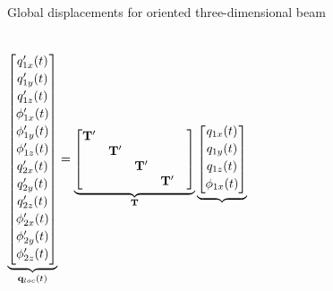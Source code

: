 \documentclass[aspectratio=169]{beamer}
\begin{document}
{\begin{frame}{Global displacements for oriented three-dimensional beam}
    \begin{columns}
      \tiny $$\underbrace{ \begin{bmatrix}
            {\color{black} q_{1x}^\prime(t)}       \\[2pt]
            {\color{black} q_{1y}^\prime(t)}       \\[2pt]
            {\color{black} q_{1z}^\prime(t)}       \\[2pt]
            {\color{black} \phi_{1x}^\prime(t)}    \\[2pt]
            {\color{black} \phi_{1y}^\prime(t)   } \\[2pt]
            {\color{black} \phi_{1z}^\prime(t)}    \\[2pt]
            {\color{black} q_{2x}^\prime(t)}       \\[2pt]
            {\color{black} q_{2y}^\prime(t)}       \\[2pt]
            {\color{black} q_{2z}^\prime(t)}       \\[2pt]
            {\color{black} \phi_{2x}^\prime(t)}    \\[2pt]
            {\color{black} \phi_{2y}^\prime(t)   } \\[2pt]
            {\color{black} \phi_{2z}^\prime(t)}    \\[2pt]
          \end{bmatrix}}_\text{$\mathbf q_{loc} (t)$} = \underbrace{ \begin{bmatrix}
            \mathbf {T^\prime} &                    &                    &                    & \\
                               & \mathbf {T^\prime} &                    &                      \\
                               &                    & \mathbf {T^\prime} &                      \\
                               &                    &                    & \mathbf {T^\prime}   \\
          \end{bmatrix}}_\text{$\mathbf T$} \underbrace{ \begin{bmatrix}
            {\color{black} q_{1x}(t)}       \\[2pt]
            {\color{black} q_{1y}(t)}       \\[2pt]
            {\color{black} q_{1z}(t)}       \\[2pt]
            {\color{black} \phi_{1x}(t)}    \\[2pt]

\end{bmatrix}}$$
\end{columns}
\end{frame}}
\end{document}

